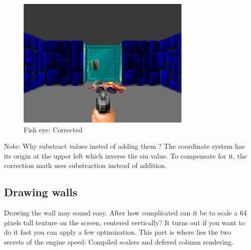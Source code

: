   \begin{figure}[H]
\centering
 \includegraphics[width=\textwidth]{screenshots/wolf3d_7_fullframe.png}
  \caption{Fish eye: Corrected} 
 \end{figure}
 \par
 Note: Why substract values insted of adding them ? The coordinate system has its origin at the upper left which inverse the sin value. To compensate for it, the correction math uses substraction instead of addition.













\subsection{Drawing walls}
Drawing the wall may sound easy. After how complicated can it be to scale a 64 pixels tall texture on the screen, centered vertically? It turns out if you want to do it fast you can apply a few optimization. This part is where lies the two secrets of the engine speed: Compiled scalers and defered column rendering.\\
\par


